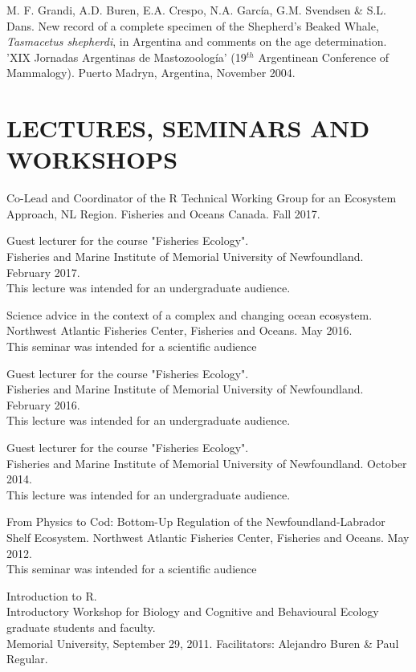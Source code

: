 \documentclass{res}
\begin{document}
\begin{resume}
\begin{hangparas}{.4in}{1}
M. F. Grandi, A.D. Buren, E.A. Crespo, N.A. García, G.M. Svendsen \& S.L. Dans. New record of a complete specimen of the Shepherd’s Beaked Whale, \textit{Tasmacetus shepherdi}, in Argentina and comments on the age determination. 'XIX Jornadas Argentinas de Mastozoolog\'{i}a' (19$^{th}$ Argentinean Conference of Mammalogy). Puerto Madryn, Argentina, November 2004.
	
	
\end{hangparas}	

\section{LECTURES, SEMINARS AND WORKSHOPS}
\vspace{0.1in} 

Co-Lead and Coordinator of the R Technical Working Group for an Ecosystem Approach, NL Region. Fisheries and Oceans Canada. Fall 2017.

Guest lecturer for the course "Fisheries Ecology".\\ Fisheries and Marine Institute of Memorial University of Newfoundland. February 2017. \\
This lecture was intended for an undergraduate audience.

Science advice in the context of a complex and changing ocean ecosystem. Northwest Atlantic Fisheries Center, Fisheries and Oceans. May 2016. \\
This seminar was intended for a scientific audience 

Guest lecturer for the course "Fisheries Ecology". \\Fisheries and Marine Institute of Memorial University of Newfoundland. February 2016. \\
This lecture was intended for an undergraduate audience.

Guest lecturer for the course "Fisheries Ecology". \\Fisheries and Marine Institute of Memorial University of Newfoundland. October 2014. \\
This lecture was intended for an undergraduate audience.

From Physics to Cod: Bottom-Up Regulation of the Newfoundland-Labrador Shelf Ecosystem. Northwest Atlantic Fisheries Center, Fisheries and Oceans. May 2012. \\
This seminar was intended for a scientific audience 

Introduction to R.\\ Introductory Workshop for Biology and Cognitive and Behavioural Ecology graduate students and faculty.\\ Memorial University, September 29, 2011. Facilitators: Alejandro Buren \& Paul Regular.


\end{resume}
\end{document}
